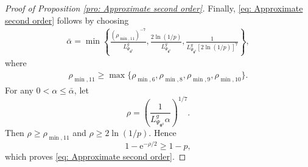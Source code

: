 \documentclass{siamart251216}
\begin{document}
\begin{proof}[Proof of Proposition \ref{pro: Approximate second order}]
    Finally, \eqref{eq: Approximate second order} follows by choosing
    \begin{gather*}
        \bar{\alpha}
        =
        \min\left\{
        \frac{(\rho_{\min,11})^{-7}}{L_{\Psi_{\boldsymbol{\theta}^{0}}}^{g}},
        \frac{2\ln(1/p)}{L_{\Psi_{\boldsymbol{\theta}^{0}}}^{g}},
        \frac{1}{L_{\Psi_{\boldsymbol{\theta}^{0}}}^{g}[2\ln(1/p)]^{7}}
        \right\},
    \end{gather*}
    where
    \begin{gather*}
        \rho_{\min,11}
        \geq
        \max\{\rho_{\min,6},\rho_{\min,8},\rho_{\min,9},\rho_{\min,10}\}.
    \end{gather*}
    For any $0<\alpha\leq\bar{\alpha}$, let
    \[
        \rho
        =
        \left(\frac{1}{L_{\Psi_{\boldsymbol{\theta}^{0}}}^{g}\alpha}\right)^{1/7}.
    \]
    Then $\rho\geq\rho_{\min,11}$ and $\rho\geq2\ln(1/p)$. Hence
    \[
        1-\mathrm{e}^{-\rho/2}\geq1-p,
    \]
    which proves \eqref{eq: Approximate second order}.
\end{proof}
\end{document}
